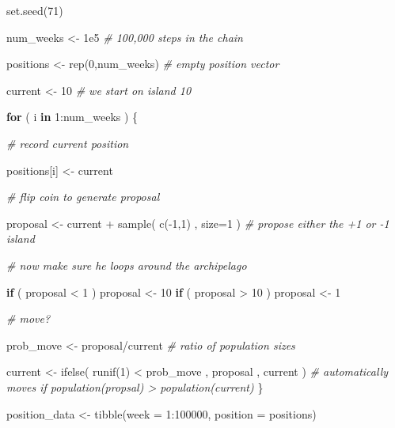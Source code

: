 \documentclass[
]{book}
\newenvironment{Shaded}{\begin{snugshade}}{\end{snugshade}}
\newcommand{\AttributeTok}[1]{\textcolor[rgb]{0.77,0.63,0.00}{#1}}
\newcommand{\CommentTok}[1]{\textcolor[rgb]{0.56,0.35,0.01}{\textit{#1}}}
\newcommand{\ControlFlowTok}[1]{\textcolor[rgb]{0.13,0.29,0.53}{\textbf{#1}}}
\newcommand{\DecValTok}[1]{\textcolor[rgb]{0.00,0.00,0.81}{#1}}
\newcommand{\FloatTok}[1]{\textcolor[rgb]{0.00,0.00,0.81}{#1}}
\newcommand{\FunctionTok}[1]{\textcolor[rgb]{0.00,0.00,0.00}{#1}}
\newcommand{\NormalTok}[1]{#1}
\newcommand{\OtherTok}[1]{\textcolor[rgb]{0.56,0.35,0.01}{#1}}
\newcommand{\SpecialCharTok}[1]{\textcolor[rgb]{0.00,0.00,0.00}{#1}}
\begin{document}
\begin{Shaded}
\begin{Highlighting}[]
\FunctionTok{set.seed}\NormalTok{(}\DecValTok{71}\NormalTok{)}

\NormalTok{num\_weeks }\OtherTok{\textless{}{-}} \FloatTok{1e5} \CommentTok{\# 100,000 steps in the chain}

\NormalTok{positions }\OtherTok{\textless{}{-}} \FunctionTok{rep}\NormalTok{(}\DecValTok{0}\NormalTok{,num\_weeks) }\CommentTok{\# empty position vector}

\NormalTok{current }\OtherTok{\textless{}{-}} \DecValTok{10} \CommentTok{\# we start on island 10}

\ControlFlowTok{for}\NormalTok{ ( i }\ControlFlowTok{in} \DecValTok{1}\SpecialCharTok{:}\NormalTok{num\_weeks ) \{ }
  
  \CommentTok{\# record current position }
  
\NormalTok{  positions[i] }\OtherTok{\textless{}{-}}\NormalTok{ current}
  
  \CommentTok{\# flip coin to generate proposal }
  
\NormalTok{  proposal }\OtherTok{\textless{}{-}}\NormalTok{ current }\SpecialCharTok{+} \FunctionTok{sample}\NormalTok{( }\FunctionTok{c}\NormalTok{(}\SpecialCharTok{{-}}\DecValTok{1}\NormalTok{,}\DecValTok{1}\NormalTok{) , }\AttributeTok{size=}\DecValTok{1}\NormalTok{ ) }\CommentTok{\# propose either the +1 or {-}1 island}
  
  \CommentTok{\# now make sure he loops around the archipelago }
  
  \ControlFlowTok{if}\NormalTok{ ( proposal }\SpecialCharTok{\textless{}} \DecValTok{1}\NormalTok{ ) proposal }\OtherTok{\textless{}{-}} \DecValTok{10} 
  \ControlFlowTok{if}\NormalTok{ ( proposal }\SpecialCharTok{\textgreater{}} \DecValTok{10}\NormalTok{ ) proposal }\OtherTok{\textless{}{-}} \DecValTok{1}

  \CommentTok{\# move?}

\NormalTok{  prob\_move }\OtherTok{\textless{}{-}}\NormalTok{ proposal}\SpecialCharTok{/}\NormalTok{current }\CommentTok{\# ratio of population sizes}

\NormalTok{  current }\OtherTok{\textless{}{-}} \FunctionTok{ifelse}\NormalTok{( }\FunctionTok{runif}\NormalTok{(}\DecValTok{1}\NormalTok{) }\SpecialCharTok{\textless{}}\NormalTok{ prob\_move , proposal , current ) }\CommentTok{\# automatically moves if population(propsal) \textgreater{} population(current)}
\NormalTok{\}}

\NormalTok{position\_data }\OtherTok{\textless{}{-}} \FunctionTok{tibble}\NormalTok{(}\AttributeTok{week =} \DecValTok{1}\SpecialCharTok{:}\DecValTok{100000}\NormalTok{, }\AttributeTok{position =}\NormalTok{ positions)}
\end{Highlighting}
\end{Shaded}
\end{document}
